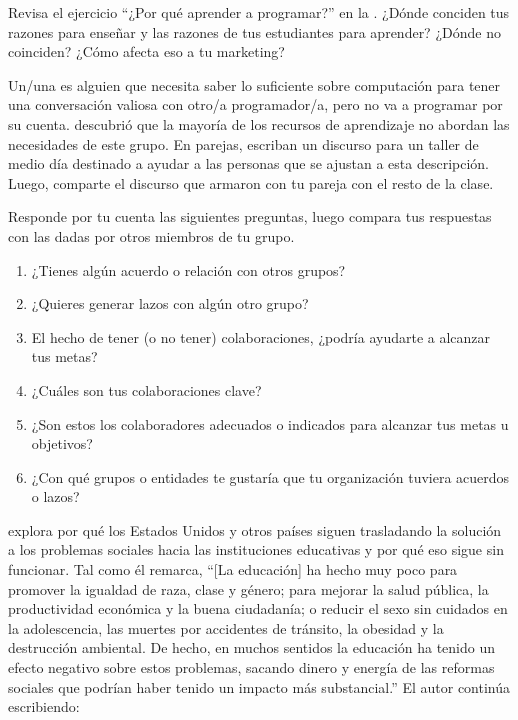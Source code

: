 Revisa el ejercicio ``¿Por qué aprender a programar?'' en la .
¿Dónde conciden tus razones para enseñar y las razones de tus estudiantes para aprender?
¿Dónde no coinciden?
¿Cómo afecta eso a tu marketing?


Un/una 
es alguien que necesita saber lo suficiente sobre computación
para tener una conversación valiosa con otro/a programador/a,
pero no va a programar por su cuenta.
\cite{Wang2018} descubrió que la mayoría de los recursos de aprendizaje no abordan las necesidades de este grupo.
En parejas,
escriban un discurso para un taller de medio día destinado a ayudar a las personas que se ajustan a esta descripción.
Luego, comparte el discurso que armaron con tu pareja con el resto de la clase.

Responde por tu cuenta las siguientes preguntas,
luego compara tus respuestas con las dadas por otros miembros de tu grupo.

\begin{enumerate}

\item
¿Tienes algún acuerdo o relación con otros grupos?

\item
¿Quieres generar lazos con algún otro grupo?

\item
El hecho de tener (o no tener) colaboraciones, 
¿podría ayudarte a alcanzar tus metas?

\item
¿Cuáles son tus colaboraciones clave?

\item
¿Son estos los colaboradores adecuados o indicados para alcanzar tus metas u objetivos?

\item
¿Con qué grupos o entidades te gustaría que tu organización
tuviera acuerdos o lazos?



\end{enumerate}


\cite{Laba2008} explora por qué los Estados Unidos y otros países
siguen trasladando la solución a los problemas sociales hacia las instituciones educativas 
y por qué eso sigue sin funcionar.
Tal como él remarca,
``[La educación] ha hecho muy poco para promover la igualdad de raza, clase y género;
para mejorar la salud pública, la productividad económica y la buena ciudadanía;
o reducir el sexo sin cuidados en la adolescencia, las muertes por accidentes de tránsito, la obesidad y la destrucción ambiental.
De hecho,
en muchos sentidos la educación ha tenido un efecto negativo sobre estos problemas,
sacando dinero y energía de las reformas sociales que podrían haber tenido un impacto más substancial.''
El autor continúa escribiendo: 

